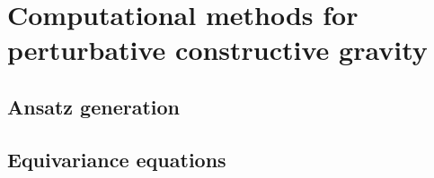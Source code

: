 \chapter{Computational methods for perturbative constructive gravity}
\label{chapter_computational_methods}

\textit{}

\section{Ansatz generation}

\section{Equivariance equations}

